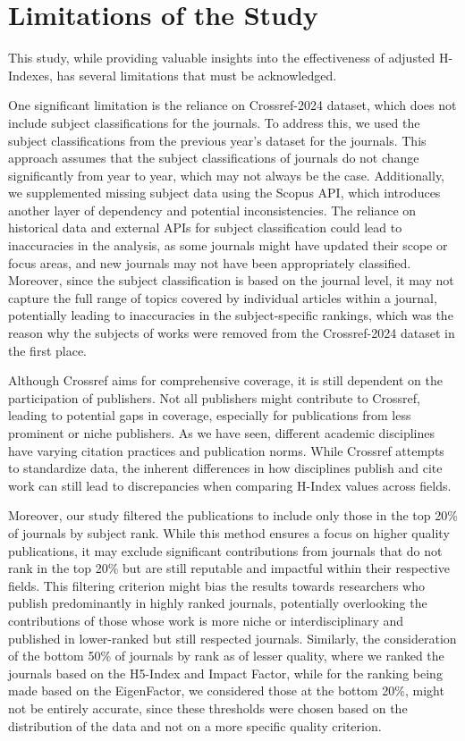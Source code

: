\section{Limitations of the Study}

This study, while providing valuable insights into the effectiveness of
adjusted H-Indexes, has several limitations that must be acknowledged.

One significant limitation is the reliance on Crossref-2024 dataset, which does
not include subject classifications for the journals. To address this, we used
the subject classifications from the previous year’s dataset for the journals.
This approach assumes that the subject classifications of journals do not
change significantly from year to year, which may not always be the case.
Additionally, we supplemented missing subject data using the Scopus API, which
introduces another layer of dependency and potential inconsistencies. The
reliance on historical data and external APIs for subject classification could
lead to inaccuracies in the analysis, as some journals might have updated their
scope or focus areas, and new journals may not have been appropriately
classified. Moreover, since the subject classification is based on the journal
level, it may not capture the full range of topics covered by individual
articles within a journal, potentially leading to inaccuracies in the
subject-specific rankings, which was the reason why the subjects of works were
removed from the Crossref-2024 dataset in the first place.

Although Crossref aims for comprehensive coverage, it is still dependent on the
participation of publishers. Not all publishers might contribute to Crossref,
leading to potential gaps in coverage, especially for publications from less
prominent or niche publishers. As we have seen, different academic disciplines
have varying citation practices and publication norms. While Crossref attempts
to standardize data, the inherent differences in how disciplines publish and
cite work can still lead to discrepancies when comparing H-Index values across
fields.

Moreover, our study filtered the publications to include only those in the top
20\% of journals by subject rank. While this method ensures a focus on higher
quality publications, it may exclude significant contributions from journals
that do not rank in the top 20\% but are still reputable and impactful within
their respective fields. This filtering criterion might bias the results
towards researchers who publish predominantly in highly ranked journals,
potentially overlooking the contributions of those whose work is more niche or
interdisciplinary and published in lower-ranked but still respected journals.
Similarly, the consideration of the bottom 50\% of journals by rank as of
lesser quality, where we ranked the journals based on the H5-Index and Impact
Factor, while for the ranking being made based on the EigenFactor, we
considered those at the bottom 20\%, might not be entirely accurate, since
these thresholds were chosen based on the distribution of the data and not on a
more specific quality criterion. %

